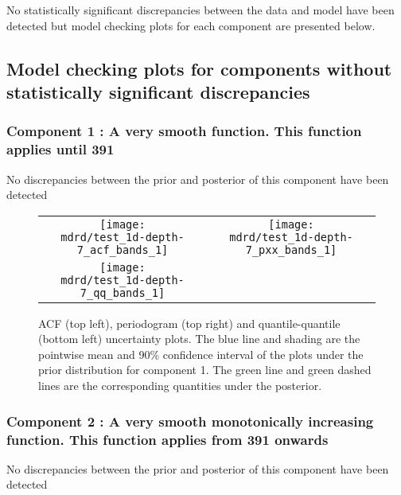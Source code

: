 \documentclass{article} %
\begin{document}
No statistically significant discrepancies between the data and model have been detected but model checking plots for each component are presented below.

\subsection{Model checking plots for components without statistically significant discrepancies}

\subsubsection{Component 1 : A very smooth function. This function applies until  391}

No discrepancies between the prior and posterior of this component have been detected

\begin{figure}[H]
\newcommand{\wmgd}{0.5\columnwidth}
\newcommand{\hmgd}{3.0cm}
\newcommand{\mdrd}{test_1d-depth-7}
\newcommand{\mbm}{\hspace{-0.3cm}}
\begin{tabular}{cc}
\mbm \texttt{[image: \\mdrd/test\_1d-depth-7\_acf\_bands\_1]} & \texttt{[image: \\mdrd/test\_1d-depth-7\_pxx\_bands\_1]} \\
\mbm \texttt{[image: \\mdrd/test\_1d-depth-7\_qq\_bands\_1]}
\end{tabular}
\caption{
ACF (top left), periodogram (top right) and quantile-quantile (bottom left) uncertainty plots.
The blue line and shading are the pointwise mean and 90\% confidence interval of the plots under the prior distribution for component 1.
The green line and green dashed lines are the corresponding quantities under the posterior.}
\label{fig:check1}
\end{figure}

\subsubsection{Component 2 : A very smooth monotonically increasing function. This function applies from  391 onwards}

No discrepancies between the prior and posterior of this component have been detected
\end{document}
